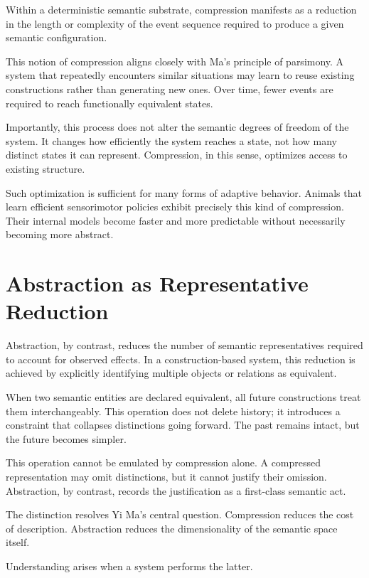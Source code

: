 \documentclass[11pt]{article}
\begin{document}
Within a deterministic semantic substrate, compression manifests as a
reduction in the length or complexity of the event sequence required to
produce a given semantic configuration.

This notion of compression aligns closely with Ma’s principle of
parsimony. A system that repeatedly encounters similar situations may
learn to reuse existing constructions rather than generating new ones.
Over time, fewer events are required to reach functionally equivalent
states.

Importantly, this process does not alter the semantic degrees of freedom
of the system. It changes how efficiently the system reaches a state, not
how many distinct states it can represent. Compression, in this sense,
optimizes access to existing structure.

Such optimization is sufficient for many forms of adaptive behavior.
Animals that learn efficient sensorimotor policies exhibit precisely this
kind of compression. Their internal models become faster and more
predictable without necessarily becoming more abstract.

\section{Abstraction as Representative Reduction}

Abstraction, by contrast, reduces the number of semantic representatives
required to account for observed effects. In a construction-based system,
this reduction is achieved by explicitly identifying multiple objects or
relations as equivalent.

When two semantic entities are declared equivalent, all future
constructions treat them interchangeably. This operation does not delete
history; it introduces a constraint that collapses distinctions going
forward. The past remains intact, but the future becomes simpler.

This operation cannot be emulated by compression alone. A compressed
representation may omit distinctions, but it cannot justify their
omission. Abstraction, by contrast, records the justification as a
first-class semantic act.

The distinction resolves Yi Ma’s central question. Compression reduces the
cost of description. Abstraction reduces the dimensionality of the
semantic space itself.

Understanding arises when a system performs the latter.
\end{document}
